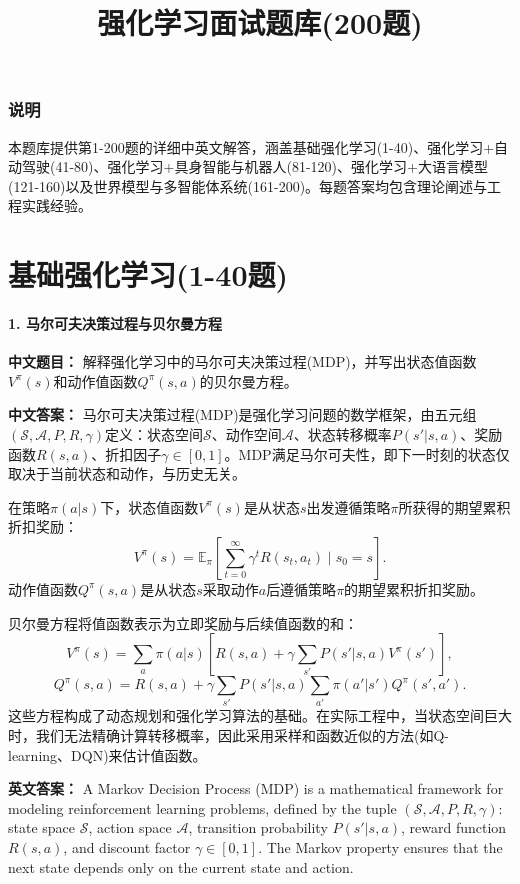 \documentclass[10pt,a4paper]{ctexart}
\title{\textbf{强化学习面试题库(200题)}}
\author{}
\date{}
\begin{document}
\maketitle

\section*{说明}
本题库提供第1-200题的详细中英文解答，涵盖基础强化学习(1-40)、强化学习+自动驾驶(41-80)、强化学习+具身智能与机器人(81-120)、强化学习+大语言模型(121-160)以及世界模型与多智能体系统(161-200)。每题答案均包含理论阐述与工程实践经验。

\part{基础强化学习(1-40题)}

\subsection*{1. 马尔可夫决策过程与贝尔曼方程}
\textbf{中文题目：} 解释强化学习中的马尔可夫决策过程(MDP)，并写出状态值函数\(V^\pi(s)\)和动作值函数\(Q^\pi(s,a)\)的贝尔曼方程。

\textbf{中文答案：}  
马尔可夫决策过程(MDP)是强化学习问题的数学框架，由五元组\((\mathcal{S}, \mathcal{A}, P, R, \gamma)\)定义：状态空间\(\mathcal{S}\)、动作空间\(\mathcal{A}\)、状态转移概率\(P(s'|s,a)\)、奖励函数\(R(s,a)\)、折扣因子\(\gamma \in [0,1]\)。MDP满足马尔可夫性，即下一时刻的状态仅取决于当前状态和动作，与历史无关。

在策略\(\pi(a|s)\)下，状态值函数\(V^\pi(s)\)是从状态\(s\)出发遵循策略\(\pi\)所获得的期望累积折扣奖励：
\[
V^\pi(s) = \mathbb{E}_\pi \left[ \sum_{t=0}^{\infty} \gamma^t R(s_t, a_t) \mid s_0 = s \right].
\]  
动作值函数\(Q^\pi(s,a)\)是从状态\(s\)采取动作\(a\)后遵循策略\(\pi\)的期望累积折扣奖励。

贝尔曼方程将值函数表示为立即奖励与后续值函数的和：
\[
V^\pi(s) = \sum_{a} \pi(a|s) \left[ R(s,a) + \gamma \sum_{s'} P(s'|s,a) V^\pi(s') \right],
\]  
\[
Q^\pi(s,a) = R(s,a) + \gamma \sum_{s'} P(s'|s,a) \sum_{a'} \pi(a'|s') Q^\pi(s',a').
\]  
这些方程构成了动态规划和强化学习算法的基础。在实际工程中，当状态空间巨大时，我们无法精确计算转移概率，因此采用采样和函数近似的方法(如Q-learning、DQN)来估计值函数。

\textbf{英文答案：}  
A Markov Decision Process (MDP) is a mathematical framework for modeling reinforcement learning problems, defined by the tuple \((\mathcal{S}, \mathcal{A}, P, R, \gamma)\): state space \(\mathcal{S}\), action space \(\mathcal{A}\), transition probability \(P(s'|s,a)\), reward function \(R(s,a)\), and discount factor \(\gamma \in [0,1]\). The Markov property ensures that the next state depends only on the current state and action.
\end{document}
